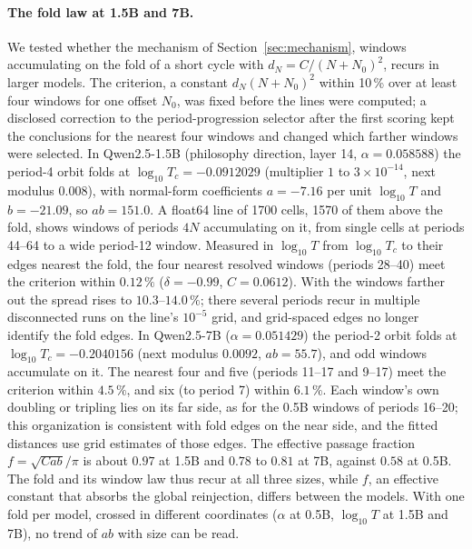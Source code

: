 \documentclass[11pt,letterpaper]{article}
\begin{document}
\paragraph{The fold law at 1.5B and 7B.} We tested whether the mechanism of Section~\ref{sec:mechanism}, windows
accumulating on the fold of a short cycle with $d_N=C/(N+N_0)^2$, recurs in larger models. The criterion, a
constant $d_N(N+N_0)^2$ within 10\,\% over at least four windows for one offset $N_0$, was fixed before the lines
were computed; a disclosed correction to the period-progression selector after the first scoring kept the conclusions
for the nearest four windows and changed which farther windows were selected. In Qwen2.5-1.5B (philosophy direction,
layer 14, $\alpha=0.058588$) the period-4 orbit folds at $\log_{10}T_c=-0.0912029$ (multiplier $1$ to
$3\times10^{-14}$, next modulus $0.008$), with normal-form coefficients $a=-7.16$ per unit $\log_{10}T$ and
$b=-21.09$, so $ab=151.0$. A float64 line of 1700 cells, 1570 of them above the fold, shows
windows of periods $4N$ accumulating on it, from single cells at periods 44--64 to a wide period-12 window. Measured in $\log_{10}T$ from $\log_{10}T_c$ to their edges nearest the fold, the four nearest resolved windows (periods 28--40) meet the criterion
within $0.12\,\%$ ($\delta=-0.99$, $C=0.0612$). With the windows farther out the spread rises to $10.3$--$14.0\,\%$;
there several periods recur in multiple disconnected runs on the line's $10^{-5}$ grid, and grid-spaced edges no
longer identify the fold edges. In Qwen2.5-7B ($\alpha=0.051429$) the period-2 orbit folds at $\log_{10}T_c=-0.2040156$ (next modulus $0.0092$,
$ab=55.7$), and odd windows accumulate on it. The nearest four and five (periods 11--17 and 9--17) meet the criterion
within $4.5\,\%$, and six (to period 7) within $6.1\,\%$. Each window's own doubling or tripling lies on its far side,
as for the 0.5B windows of periods 16--20; this organization is consistent with fold edges on the near side, and the
fitted distances use grid estimates of those edges. The effective passage fraction $f=\sqrt{Cab}/\pi$ is about $0.97$
at 1.5B and $0.78$ to $0.81$ at 7B, against $0.58$ at 0.5B. The fold and its window law thus recur at all three sizes,
while $f$, an effective constant that absorbs the global reinjection, differs between the models. With one
fold per model, crossed in different coordinates ($\alpha$ at 0.5B, $\log_{10}T$ at 1.5B and 7B), no trend of $ab$
with size can be read.
\end{document}
